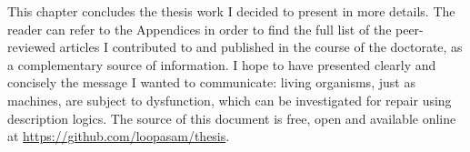 \hrulefill

This chapter concludes the thesis work I decided to present in more details. The reader can refer to the Appendices in order to find the full list of the peer-reviewed articles I contributed to and published in the course of the doctorate, as a complementary source of information. I hope to have presented clearly and concisely the message I wanted to communicate: living organisms, just as machines, are subject to dysfunction, which can be investigated for repair using description logics. The source of this document is free, open and available online at \url{https://github.com/loopasam/thesis}.
